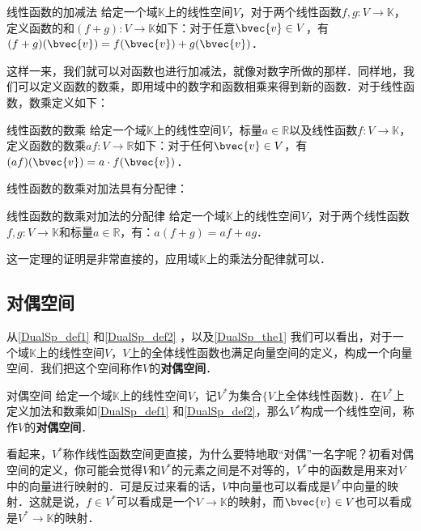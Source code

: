 \begin{definition}{线性函数的加减法}\label{DualSp_def1}
给定一个域$\mathbb{K}$上的线性空间$V$，对于两个线性函数$f, g: V\rightarrow\mathbb{K}$，定义函数的和$(f+g):V\rightarrow\mathbb{K}$如下：对于任意$\bvec{v}\in V$，有$(f+g)(\bvec{v})=f(\bvec{v})+g(\bvec{v})$．
\end{definition}

这样一来，我们就可以对函数也进行加减法，就像对数字所做的那样．同样地，我们可以定义函数的数乘，即用域中的数字和函数相乘来得到新的函数．对于线性函数，数乘定义如下：

\begin{definition}{线性函数的数乘}\label{DualSp_def2}
给定一个域$\mathbb{K}$上的线性空间$V$，标量$a\in\mathbb{R}$以及线性函数$f: V\rightarrow\mathbb{K}$，定义函数的数乘$af:V\rightarrow\mathbb{R}$如下：对于任何$\bvec{v}\in V$，有$(af)(\bvec{v})=a\cdot f(\bvec{v})$．
\end{definition}

线性函数的数乘对加法具有分配律：

\begin{theorem}{线性函数的数乘对加法的分配律}\label{DualSp_the1}
给定一个域$\mathbb{K}$上的线性空间$V$，对于两个线性函数$f, g: V\rightarrow\mathbb{K}$和标量$a\in\mathbb{R}$，有：$a(f+g)=af+ag$．
\end{theorem}

这一定理的证明是非常直接的，应用域$\mathbb{K}$上的乘法分配律就可以．

\subsection{对偶空间}

从\autoref{DualSp_def1} 和\autoref{DualSp_def2} ，以及\autoref{DualSp_the1} 我们可以看出，对于一个域$\mathbb{K}$上的线性空间$V$，$V$上的全体线性函数也满足向量空间的定义，构成一个向量空间．我们把这个空间称作$V$的\textbf{对偶空间}．

\begin{definition}{对偶空间}
给定一个域$\mathbb{K}$上的线性空间$V$，记$V^*$为集合$\{V\text{上全体线性函数}\}$．在$V^*$上定义加法和数乘如\autoref{DualSp_def1} 和\autoref{DualSp_def2}，那么$V^*$构成一个线性空间，称作$V$的\textbf{对偶空间}．
\end{definition}

看起来，$V^*$称作线性函数空间更直接，为什么要特地取“对偶”一名字呢？初看对偶空间的定义，你可能会觉得$V$和$V^*$的元素之间是不对等的，$V^*$中的函数是用来对$V$中的向量进行映射的．可是反过来看的话，$V$中向量也可以看成是$V^*$中向量的映射．这就是说，$f\in V^*$可以看成是一个$V\rightarrow\mathbb{K}$的映射，而$\bvec{v}\in V$也可以看成是$V^*\rightarrow\mathbb{K}$的映射．

